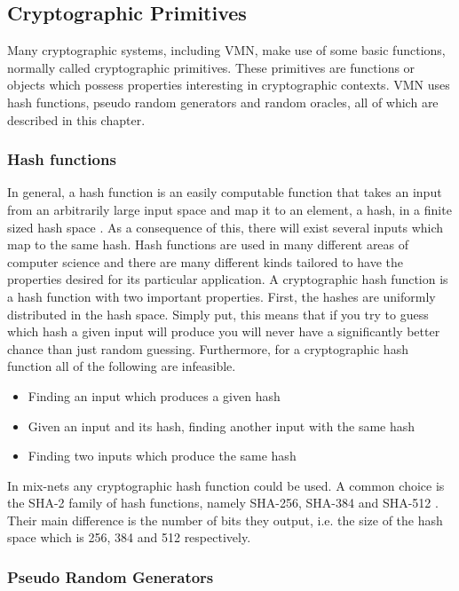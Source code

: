 \subsection{Cryptographic Primitives}

Many cryptographic systems, including VMN, make use of some basic
functions, normally called cryptographic primitives. These primitives
are functions or objects which possess properties interesting in
cryptographic contexts. VMN uses hash functions, pseudo random
generators and random oracles, all of which are described in this
chapter.

\subsubsection{Hash functions}
In general, a hash function is an easily computable function that
takes an input from an arbitrarily large input space and map it to an
element, a hash, in a finite sized hash space \cite[p.~321]{hac}. As a
consequence of this, there will exist several inputs which map to the
same hash. Hash functions are used in many different areas of computer
science and there are many different kinds tailored to have the
properties desired for its particular application. A cryptographic
hash function is a hash function with two important properties. First,
the hashes are uniformly distributed in the hash space. Simply put,
this means that if you try to guess which hash a given input will
produce you will never have a significantly better chance than just
random guessing. Furthermore, for a cryptographic hash function all of
the following are infeasible.

\begin{itemize}
\item Finding an input which produces a given hash
\item Given an input and its hash, finding another input with the same hash
\item Finding two inputs which produce the same hash
\end{itemize}

In mix-nets any cryptographic hash function could be used. A common
choice is the SHA-2 family of hash functions, namely SHA-256, SHA-384
and SHA-512 \cite[p.~6]{wikstrom1}. Their main difference is the
number of bits they output, i.e. the size of the hash space which is
256, 384 and 512 respectively.

\subsubsection{Pseudo Random Generators}


